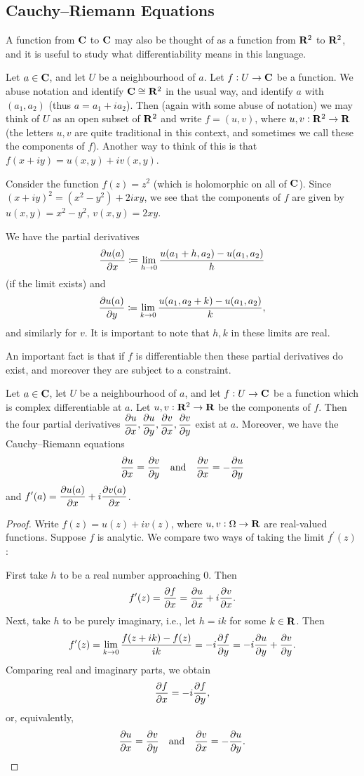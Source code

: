 \subsection{Cauchy--Riemann Equations}
A function from $\mathbf C$ to $\mathbf C$ may also be thought of as a function from $\mathbf R^2$ to $\mathbf R^2$, and it is useful to study what differentiability means in this language.

Let $a\in\mathbf C$, and let $U$ be a neighbourhood of $a$. Let $f:U\to\mathbf C$ be a function. We abuse notation and identify $\mathbf C\cong\mathbf R^2$ in the usual way, and identify $a$ with $(a_1,a_2)$ (thus $a=a_1+ia_2$). Then (again with some abuse of notation) we may think of $U$ as an open subset of $\mathbf R^2$ and write $f=(u,v)$, where $u,v:\mathbf R^2\to\mathbf R$ (the letters $u,v$ are quite traditional in this context, and sometimes we call these the components of $f$). Another way to think of this is that $f(x+iy)=u(x,y)+iv(x,y)$.

\begin{example}
Consider the function $f(z)=z^2$ (which is holomorphic on all of $\mathbf C$). Since $(x+iy)^2=(x^2-y^2)+2ixy$, we see that the components of $f$ are given by $u(x,y)=x^2-y^2$, $v(x,y)=2xy$.
\end{example}

We have the partial derivatives
\[\pdv{u(a)}{x}\coloneqq\lim_{h\to0}\frac{u(a_1+h,a_2)-u(a_1,a_2)}{h}\]
(if the limit exists) and
\[\pdv{u(a)}{y}\coloneqq\lim_{k\to0}\frac{u(a_1,a_2+k)-u(a_1,a_2)}{k},\]
and similarly for $v$. It is important to note that $h, k$ in these limits are real.

An important fact is that if $f$ is differentiable then these partial derivatives do exist, and moreover they are subject to a constraint.

\begin{theorem}
Let $a\in\mathbf C$, let $U$ be a neighbourhood of $a$, and let $f:U\to\mathbf C$ be a function which is complex differentiable at $a$. Let $u,v:\mathbf R^2\to\mathbf R$ be the components of $f$. Then the four partial derivatives $\displaystyle\pdv{u}{x}, \pdv{u}{y}, \pdv{v}{x}, \pdv{v}{y}$ exist at $a$. Moreover, we have the Cauchy--Riemann equations
\begin{equation}
\pdv{u}{x}=\pdv{v}{y}\quad\text{and}\quad\pdv{v}{x}=-\pdv{u}{y}
\end{equation}
and $\displaystyle f^\prime(a)=\pdv{u(a)}{x}+i\pdv{v(a)}{x}$.
\end{theorem}

\begin{proof}
Write $f(z)=u(z)+iv(z)$, where $u,v:\Omega\to\mathbf R$ are real-valued functions. Suppose $f$ is analytic. We compare two ways of taking the limit $f^\prime(z)$:

First take $h$ to be a real number approaching $0$. Then
\[f^\prime(z)=\pdv{f}{x}=\pdv{u}{x}+i\pdv{v}{x}.\]
Next, take $h$ to be purely imaginary, i.e., let $h=ik$ for some $k\in\mathbf R$. Then
\[f^\prime(z)=\lim_{k\to0}\frac{f(z+ik)-f(z)}{ik}=-i\pdv{f}{y}=-i\pdv{u}{y}+\pdv{v}{y}.\]
Comparing real and imaginary parts, we obtain
\[\pdv{f}{x}=-i\pdv{f}{y},\]
or, equivalently,
\[\pdv{u}{x}=\pdv{v}{y}\quad\text{and}\quad\pdv{v}{x}=-\pdv{u}{y}.\]
\end{proof}

